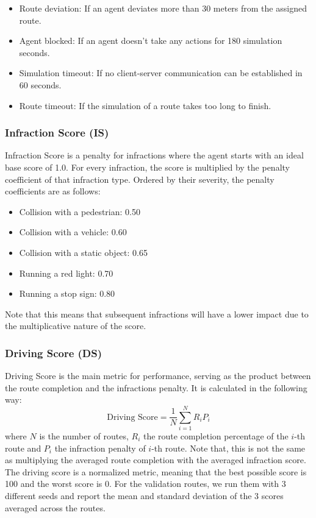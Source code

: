 \documentclass[letterpaper, 12pt]{book}
\theoremstyle{definition}
\theoremstyle{definition}
\theoremstyle{definition}
\theoremstyle{definition}
\theoremstyle{definition}
\begin{document}
\begin{itemize}
\item Route deviation: If an agent deviates more than 30 meters from the assigned route.
\item Agent blocked: If an agent doesn’t take any actions for 180 simulation seconds.
\item Simulation timeout: If no client-server communication can be established in 60 seconds.
\item Route timeout: If the simulation of a route takes too long to finish.
\end{itemize}

\subsubsection{Infraction Score (IS)}
\label{sec:org2f789db}
Infraction Score is a penalty for infractions where the agent starts with
an ideal base score of 1.0. For every infraction, the score is multiplied by the
penalty coefficient of that infraction type. Ordered by their severity, the
penalty coefficients are as follows:
\begin{itemize}
\item Collision with a pedestrian: 0.50
\item Collision with a vehicle: 0.60
\item Collision with a static object: 0.65
\item Running a red light: 0.70
\item Running a stop sign: 0.80
\end{itemize}
Note that this means that subsequent infractions will have a lower impact due to the
multiplicative nature of the score.

\subsubsection{Driving Score (DS)}
\label{sec:orgbf0416f}
Driving Score is the main metric for performance, serving as the product between
the route completion and the infractions penalty. It is calculated in the
following way: \[\text{Driving Score}=\frac1N\sum_{i=1}^{N}R_{i}P_{i}\] where \(N\) is the
number of routes, \(R_{i}\) the route completion percentage of the \(i\)-th route and
\(P_{i}\) the infraction penalty of \(i\)-th route. Note that, this is not the
same as multiplying the averaged route completion with the averaged infraction
score. The driving score is a normalized metric, meaning that the best possible
score is 100 and the worst score is 0. For the validation routes, we run them
with 3 different seeds and report the mean and standard deviation of the 3
scores averaged across the routes.
\end{document}
